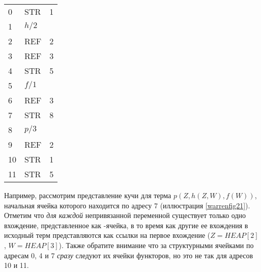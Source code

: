 \label{warrenfig21}

\begin{tabular}{l l l}
0 & STR & 1 \\
1 & $h/2$ \\
2 & REF & 2\\
3 & REF & 3\\
4 & STR & 5\\
5 & $f/1$\\
6 & REF & 3\\
7 & STR & 8\\
8 & $p/3$\\
9 & REF & 2\\
10 & STR & 1\\
11 & STR & 5\\
\end{tabular}

\bigskip
Например, рассмотрим представление кучи для терма $p(Z,h(Z,W),f(W))$, начальная
ячейка которого находится по адресу 7 (иллюстрация \ref{warrenfig21}).
Отметим что \emph{для каждой} непривязанной переменной существует только одно
вхождение, представленное как -ячейка, в то время как другие ее
вхождения в исходный терм представляются как ссылки на первое вхождение
($Z=HEAP[2]$, $W=HEAP[3]$). Также обратите внимание что за структурными ячейками
по адресам 0, 4 и 7 \emph{сразу} следуют их ячейки функторов, но это не так для
адресов 10 и 11.